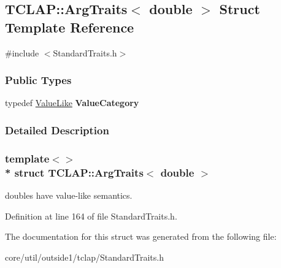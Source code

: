\hypertarget{structTCLAP_1_1ArgTraits_3_01double_01_4}{}\subsection{T\+C\+L\+AP\+:\+:Arg\+Traits$<$ double $>$ Struct Template Reference}
\label{structTCLAP_1_1ArgTraits_3_01double_01_4}


{\ttfamily \#include $<$Standard\+Traits.\+h$>$}

\subsubsection*{Public Types}
\begin{DoxyCompactItemize}
\item 
typedef \hyperlink{structTCLAP_1_1ValueLike}{Value\+Like} {\bfseries Value\+Category}\hypertarget{structTCLAP_1_1ArgTraits_3_01double_01_4_a06ac5f8ebfcbc537e9ce57b96836dd3d}{}\label{structTCLAP_1_1ArgTraits_3_01double_01_4_a06ac5f8ebfcbc537e9ce57b96836dd3d}

\end{DoxyCompactItemize}


\subsubsection{Detailed Description}
\subsubsection*{template$<$$>$\\*
struct T\+C\+L\+A\+P\+::\+Arg\+Traits$<$ double $>$}

doubles have value-\/like semantics. 

Definition at line 164 of file Standard\+Traits.\+h.



The documentation for this struct was generated from the following file\+:\begin{DoxyCompactItemize}
\item 
core/util/outside1/tclap/Standard\+Traits.\+h\end{DoxyCompactItemize}
